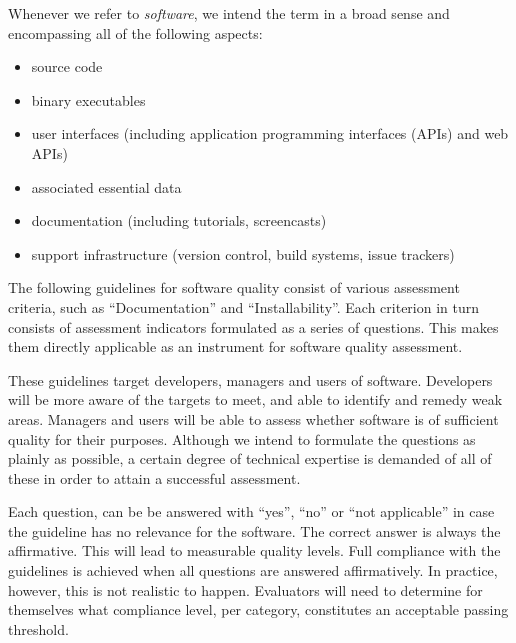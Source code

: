 \documentclass[a4paper,11pt]{article}
\begin{document}
Whenever we refer to \emph{software}, we intend the term in a broad sense and
encompassing all of the following aspects:
\begin{itemize}
    \item source code
    \item binary executables
    \item user interfaces (including application programming interfaces (APIs) and web APIs)
    \item associated essential data
%
%
%
    \item documentation (including tutorials, screencasts)
    \item support infrastructure (version control, build systems, issue trackers)
\end{itemize}

The following guidelines for software quality consist of various assessment
criteria, such as ``Documentation'' and ``Installability''. Each criterion in turn
consists of assessment indicators formulated as a series of questions. This
makes them directly applicable as an instrument for software quality
assessment. 

These guidelines target developers, managers and users of software.
Developers will be more aware of the targets to meet, and able to identify and
remedy weak areas. Managers and users will be able to assess whether software
is of sufficient quality for their purposes. Although we intend to
formulate the questions as plainly as possible, a certain degree of technical
expertise is demanded of all of these in order to attain a successful
assessment.

Each question, can be be answered with ``yes'', ``no'' or ``not applicable'' in
case the guideline has no relevance for the software. The correct answer is
always the affirmative. This will lead to measurable quality levels. Full
compliance with the guidelines is achieved when all questions are answered
affirmatively.  In practice, however, this is not realistic to happen.
Evaluators will need to determine for themselves what compliance level, per
category, constitutes an acceptable passing threshold.
\end{document}
